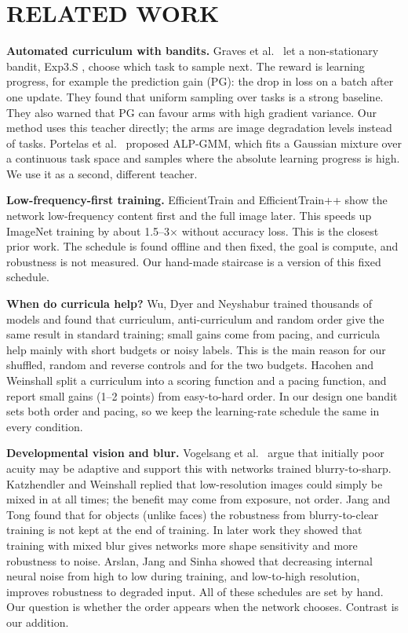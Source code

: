\documentclass[a4paper,12pt]{report}
\begin{document}
\chapter{RELATED WORK}

\textbf{Automated curriculum with bandits.} Graves et al.\ \cite{graves2017} let a non-stationary bandit, Exp3.S \cite{auer2002}, choose which task to sample next. The reward is learning progress, for example the prediction gain (PG): the drop in loss on a batch after one update. They found that uniform sampling over tasks is a strong baseline. They also warned that PG can favour arms with high gradient variance. Our method uses this teacher directly; the arms are image degradation levels instead of tasks. Portelas et al.\ \cite{portelas2019} proposed ALP-GMM, which fits a Gaussian mixture over a continuous task space and samples where the absolute learning progress is high. We use it as a second, different teacher.

\textbf{Low-frequency-first training.} EfficientTrain \cite{wang2023efficienttrain} and EfficientTrain++ \cite{wang2024efficienttrainpp} show the network low-frequency content first and the full image later. This speeds up ImageNet training by about 1.5--3$\times$ without accuracy loss. This is the closest prior work. The schedule is found offline and then fixed, the goal is compute, and robustness is not measured. Our hand-made staircase is a version of this fixed schedule.

\textbf{When do curricula help?} Wu, Dyer and Neyshabur \cite{wu2021curricula} trained thousands of models and found that curriculum, anti-curriculum and random order give the same result in standard training; small gains come from pacing, and curricula help mainly with short budgets or noisy labels. This is the main reason for our shuffled, random and reverse controls and for the two budgets. Hacohen and Weinshall \cite{hacohen2019} split a curriculum into a scoring function and a pacing function, and report small gains (1--2 points) from easy-to-hard order. In our design one bandit sets both order and pacing, so we keep the learning-rate schedule the same in every condition.

\textbf{Developmental vision and blur.} Vogelsang et al.\ \cite{vogelsang2018} argue that initially poor acuity may be adaptive and support this with networks trained blurry-to-sharp. Katzhendler and Weinshall \cite{katzhendler2019} replied that low-resolution images could simply be mixed in at all times; the benefit may come from exposure, not order. Jang and Tong \cite{jang2021blurry} found that for objects (unlike faces) the robustness from blurry-to-clear training is not kept at the end of training. In later work \cite{jang2024blur} they showed that training with mixed blur gives networks more shape sensitivity and more robustness to noise. Arslan, Jang and Sinha \cite{arslan2024noise} showed that decreasing internal neural noise from high to low during training, and low-to-high resolution, improves robustness to degraded input. All of these schedules are set by hand. Our question is whether the order appears when the network chooses. Contrast is our addition.
\end{document}
